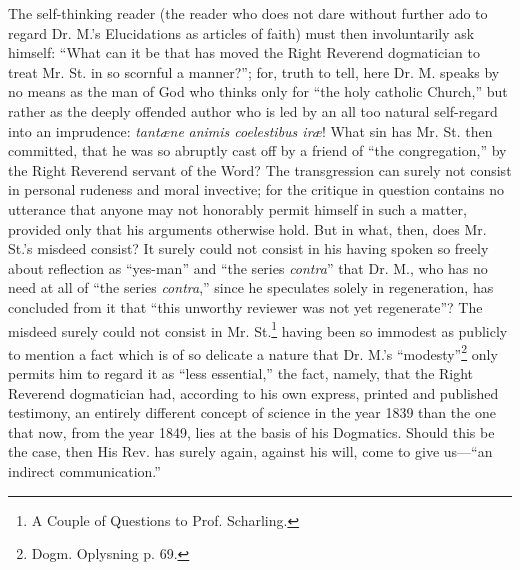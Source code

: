 \documentclass[12pt,a4paper,openany]{book}
\newcommand{\opage}[1]{\marginnote{\footnotesize\textit{[#1]}}}
\begin{document}
The self-thinking reader (the reader who does not dare
without further ado to regard Dr. M.'s Elucidations as articles of faith)
must then involuntarily ask himself: ``What can it be
that has moved the Right Reverend dogmatician to
treat Mr. St. in so scornful a manner?''; for, truth
to tell, here Dr. M. speaks by no means as the man of God
who thinks only for ``the holy catholic Church,'' but
rather as the deeply offended author who is led by an all too
natural self-regard into an imprudence: \textit{tantæne}
\textit{animis coelestibus iræ}! What sin has Mr. St. then committed, that he
was so abruptly cast off by a friend of ``the congregation,'' by the Right Reverend servant of the Word? The transgression can surely not consist in personal rudeness and moral invective;
for the critique in question contains no utterance that anyone may not
honorably permit himself in such a matter, provided only that his arguments otherwise
hold. But in what, then, does Mr. St.'s
\setcounter{footnote}{0}%
\opage{27}misdeed consist? It surely could not consist in his
having spoken so freely about reflection as ``yes-man'' and ``the series
\textit{contra}'' that Dr. M., who has no need at all of ``the series \textit{contra},''
since he speculates solely in regeneration, has
concluded from it that ``this unworthy reviewer was not yet regenerate''?
The misdeed surely could not consist in Mr.
St.\footnote[1]{A Couple of Questions to Prof. Scharling.} having been so immodest as publicly to mention a fact
which is of so delicate a nature that Dr. M.'s ``modesty''\footnote[2]{Dogm. Oplysning p. 69.}
only permits him to regard it as ``less essential,''
the fact, namely, that the Right Reverend dogmatician
had, according to his own express, printed and published
testimony, an entirely different concept of science
in the year 1839 than the one that now, from the year 1849, lies
at the basis of his Dogmatics. Should this be the case,
then His Rev. has surely again, against his will, come
to give us---``an indirect communication.''
\end{document}
